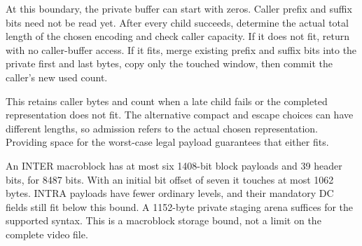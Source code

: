 At this boundary, the private buffer can start with zeros. Caller prefix and suffix
bits need not be read yet. After every child succeeds, determine the actual total
length of the chosen encoding and check caller capacity. If it does not fit,
return with no caller-buffer access. If it fits, merge existing prefix and suffix
bits into the private first and last bytes, copy only the touched window, then
commit the caller's new used count.

This retains caller bytes and count when a late child fails or the completed
representation does not fit. The alternative compact and escape choices can have
different lengths, so admission refers to the actual chosen representation.
Providing space for the worst-case legal payload guarantees that either fits.

An INTER macroblock has at most six 1408-bit block payloads and 39 header bits,
for 8487 bits. With an initial bit offset of seven it touches at most 1062 bytes.
INTRA payloads have fewer ordinary levels, and their mandatory DC fields still
fit below this bound. A 1152-byte private staging arena suffices for the supported
syntax. This is a macroblock storage bound, not a limit on the complete video file.
